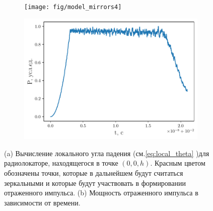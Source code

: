  \begin{figure}[h]
     \begin{subfigure}{.59\linewidth}
         \centering
         \texttt{[image: fig/model\_mirrors4]}
         \caption{}
     \end{subfigure}
     \begin{subfigure}{.39\linewidth}
         \centering
         \includegraphics[width=\linewidth]{fig/model_impuls4}
         \caption{}
     \end{subfigure}
     \caption{(a) Вычисление локального угла падения (см.\eqref{eq:local_theta} )для радиолокаторе,
     находящегося в точке $(0,0,h)$. Красным цветом обозначены точки, которые в
 дальнейшем будут считаться зеркальными и которые будут участвовать в
 формировании отраженного импульса.
 (b) Мощность отраженного импульса в зависимости от времени.}
     \label{fig:flat_surf1}
 \end{figure}
